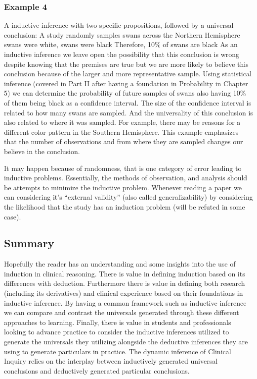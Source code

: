 \documentclass[
]{book}
\begin{document}
\hypertarget{example-4}{%
\subsubsection{Example 4}\label{example-4}}

A inductive inference with two specific propositions, followed by a universal conclusion:
A study randomly samples swans across the Northern Hemisphere
swans were white, swans were black
Therefore, 10\% of swans are black
As an inductive inference we leave open the possibility that this conclusion is wrong despite knowing that the premises are true but we are more likely to believe this conclusion because of the larger and more representative sample. Using statistical inference (covered in Part II after having a foundation in Probability in Chapter 5) we can determine the probability of future samples of swans also having 10\% of them being black as a confidence interval. The size of the confidence interval is related to how many swans are sampled. And the universality of this conclusion is also related to where it was sampled. For example, there may be reasons for a different color pattern in the Southern Hemisphere. This example emphasizes that the number of observations and from where they are sampled changes our believe in the conclusion.

It may happen because of randomness, that is one category of error leading to inductive problems. Essentially, the methods of observation, and analysis should be attempts to minimize the inductive problem. Whenever reading a paper we can considering it's ``external validity'' (also called generalizability) by considering the likelihood that the study has an induction problem (will be refuted in some case).

\hypertarget{summary}{%
\subsection{Summary}\label{summary}}

Hopefully the reader has an understanding and some insights into the use of induction in clinical reasoning. There is value in defining induction based on its differences with deduction. Furthermore there is value in defining both research (including its derivatives) and clinical experience based on their foundations in inductive inference. By having a common framework such as inductive inference we can compare and contrast the universals generated through these different approaches to learning. Finally, there is value in students and professionals looking to advance practice to consider the inductive inferences utilized to generate the universals they utilizing alongside the deductive inferences they are using to generate particulars in practice. The dynamic inference of Clinical Inquiry relies on the interplay between inductively generated universal conclusions and deductively generated particular conclusions.
\end{document}
